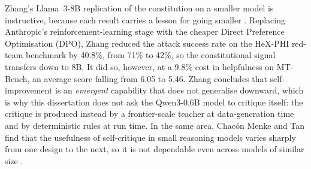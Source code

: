 Zhang's Llama~3-8B replication of the constitution on a smaller model is instructive, because each result carries a lesson for going smaller \cite{zhang2025constitutioncollapseexploringconstitutional}. Replacing Anthropic's reinforcement-learning stage with the cheaper Direct Preference Optimisation (DPO), Zhang reduced the attack success rate on the HeX-PHI red-team benchmark by 40.8\%, from 71\% to 42\%, so the constitutional signal transfers down to 8B. It did so, however, at a 9.8\% cost in helpfulness on MT-Bench, an average score falling from 6.05 to 5.46. Zhang concludes that self-improvement is an \emph{emergent} capability that does not generalise downward, which is why this dissertation does not ask the Qwen3-0.6B model to critique itself: the critique is produced instead by a frontier-scale teacher at data-generation time and by deterministic rules at run time. In the same area, Chac\'on Menke and Tan find that the usefulness of self-critique in small reasoning models varies sharply from one design to the next, so it is not dependable even across models of similar size \cite{menke2025effectiveconstitutionalaismall}.


